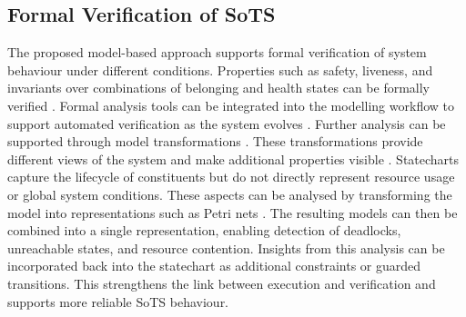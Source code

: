 \subsection{Formal Verification of SoTS}
The proposed model-based approach supports formal verification of system behaviour under different conditions. Properties such as safety, liveness, and invariants over combinations of belonging and health states can be formally verified \cite{henzinger2023quantitative}. Formal analysis tools can be integrated into the modelling workflow to support automated verification as the system evolves \cite{drusinsky2011modeling}. Further analysis can be supported through model transformations \cite{biehl2010literature}. These transformations provide different views of the system and make additional properties visible \cite{bezivin2006model}. Statecharts capture the lifecycle of constituents but do not directly represent resource usage or global system conditions. These aspects can be analysed by transforming the model into representations such as Petri nets \cite{cortadella1995synthesizing}. The resulting models can then be combined into a single representation, enabling detection of deadlocks, unreachable states, and resource contention. Insights from this analysis can be incorporated back into the statechart as additional constraints or guarded transitions. This strengthens the link between execution and verification and supports more reliable SoTS behaviour.